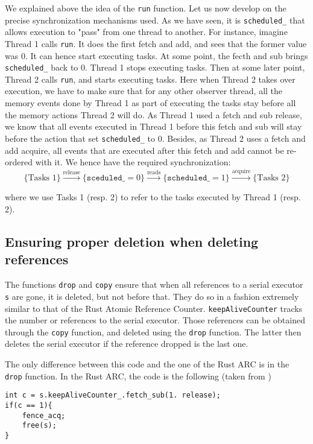 We explained above the idea of the \texttt{run} function. Let us now develop on the precise synchronization mechanisms used. As we have seen, it is \texttt{scheduled\_} that allows execution to "pass" from one thread to another. For instance, imagine Thread 1 calls \texttt{run}. It does the first fetch and add, and sees that the former value was 0. It can hence start executing tasks. At some point, the fecth and sub brings \texttt{scheduled\_} back to 0. Thread 1 stops executing tasks. Then at some later point, Thread 2 calls \texttt{run}, and starts executing tasks. Here when Thread 2 takes over execution, we have to make sure that for any other observer thread, all the memory events done by Thread 1 as part of executing the tasks stay before all the memory actions Thread 2 will do. As Thread 1 used a fetch and sub release, we know that all events executed in Thread 1 before this fetch and sub will stay before the action that set \texttt{scheduled\_} to 0. Besides, as Thread 2 uses a fetch and add acquire, all events that are executed after this fetch and add cannot be re-ordered with it. We hence have the required synchronization:
\[
				\{\text{Tasks 1}\} 
				\xrightarrow{\text{release}} 
				\{\mathtt{sceduled\_} = 0\} 
				\xrightarrow{\text{reads}} 
				\{\mathtt{scheduled\_} = 1\} 
				\xrightarrow{\text{acquire}} 
				\{\text{Tasks 2}\}
		\]

where we use Tasks 1 (resp. 2) to refer to the tasks executed by Thread 1 (resp. 2).

\subsection{Ensuring proper deletion when deleting references}
The functions \texttt{drop} and \texttt{copy} ensure that when all references to a serial executor \texttt{s} are gone, it is deleted, but not before that. They do so in a fashion extremely similar to that of the Rust Atomic Reference Counter. \texttt{keepAliveCounter} tracks the number or references to the serial executor. Those references can be obtained through the \texttt{copy} function, and deleted using the \texttt{drop} function. The latter then deletes the serial executor if the reference dropped is the last one. 

The only difference between this code and the one of the Rust ARC is in the \texttt{drop} function. In the Rust ARC, the code is the following (taken from \cite{fsl})

\begin{lstlisting}
int c = s.keepAliveCounter_.fetch_sub(1. release);
if(c == 1){
	fence_acq;
	free(s);
}
\end{lstlisting}

